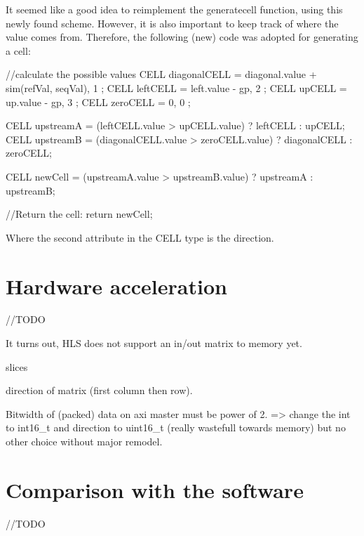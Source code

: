 It seemed like a good idea to reimplement the generatecell function, using this newly found scheme. However, it is also important to keep track of where the value comes from. Therefore, the following (new) code was adopted for generating a cell:

\begin{lcverbatim}
	//calculate the possible  values
	CELL diagonalCELL = { diagonal.value + sim(refVal, seqVal), 1 };
	CELL leftCELL = { left.value - gp, 2 };
	CELL upCELL = { up.value - gp, 3 };
	CELL zeroCELL = { 0, 0 };
	
	CELL upstreamA = (leftCELL.value > upCELL.value) ? leftCELL : upCELL;
	CELL upstreamB = (diagonalCELL.value > zeroCELL.value) ? 
	diagonalCELL : zeroCELL;
	
	CELL newCell = (upstreamA.value > upstreamB.value) ? upstreamA : upstreamB;
	
	//Return the cell:
	return newCell;
\end{lcverbatim}

Where the second attribute in the CELL type is the direction.

\section{Hardware acceleration}

//TODO

It turns out, HLS does not support an in/out matrix to memory yet.

slices

direction of matrix (first column then row).

Bitwidth of (packed) data on axi master must be power of 2. => change the int to int16\_t and direction to uint16\_t (really wastefull towards memory) but no other choice without major remodel.

\section{Comparison with the software}

//TODO